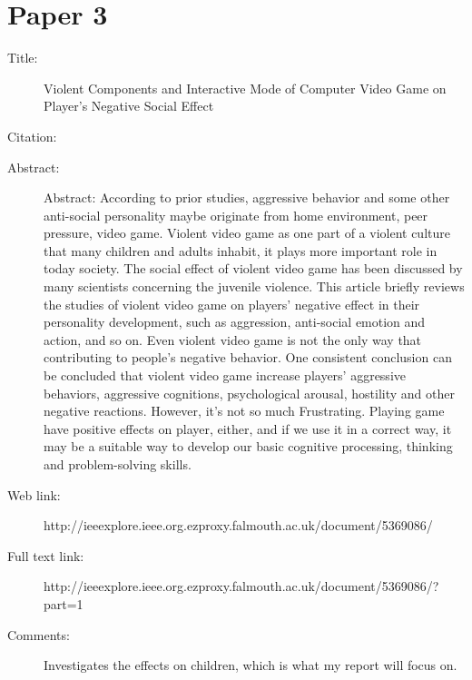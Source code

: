 \documentclass{scrartcl}
\begin{document}
\section*{Paper 3}
\begin{description}
\item[Title:] Violent Components and Interactive Mode of Computer Video Game on Player's Negative Social Effect
\item[Citation:] \cite{components}
\item[Abstract:] Abstract:
According to prior studies, aggressive behavior and some other anti-social personality maybe originate from home environment, peer pressure, video game. Violent video game as one part of a violent culture that many children and adults inhabit, it plays more important role in today society. The social effect of violent video game has been discussed by many scientists concerning the juvenile violence. This article briefly reviews the studies of violent video game on players’ negative effect in their personality development, such as aggression, anti-social emotion and action, and so on. Even violent video game is not the only way that contributing to people’s negative behavior. One consistent conclusion can be concluded that violent video game increase players’ aggressive behaviors, aggressive cognitions, psychological arousal, hostility and other negative reactions. However, it's not so much Frustrating. Playing game have positive effects on player, either, and if we use it in a correct way, it may be a suitable way to develop our basic cognitive processing, thinking and problem-solving skills.
\item[Web link:] http://ieeexplore.ieee.org.ezproxy.falmouth.ac.uk/document/5369086/
\item[Full text link:] http://ieeexplore.ieee.org.ezproxy.falmouth.ac.uk/document/5369086/?part=1
\item[Comments:] Investigates the effects on children, which is what my report will focus on. 
\end{description}
\end{document}

